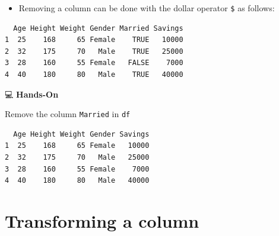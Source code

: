 \documentclass[
  letterpaper,
  DIV=11,
  numbers=noendperiod]{scrreprt}
\newenvironment{Shaded}{\begin{snugshade}}{\end{snugshade}}
\newcommand{\ConstantTok}[1]{\textcolor[rgb]{0.56,0.35,0.01}{#1}}
\newcommand{\NormalTok}[1]{\textcolor[rgb]{0.00,0.23,0.31}{#1}}
\newcommand{\OtherTok}[1]{\textcolor[rgb]{0.00,0.23,0.31}{#1}}
\newcommand{\SpecialCharTok}[1]{\textcolor[rgb]{0.37,0.37,0.37}{#1}}
\providecommand{\tightlist}{%
  \setlength{\itemsep}{0pt}\setlength{\parskip}{0pt}}\usepackage{longtable,booktabs,array}
\begin{document}
\begin{itemize}
\tightlist
\item
  Removing a column can be done with the dollar operator \texttt{\$} as
  follows:
\end{itemize}

\begin{Shaded}
\end{Shaded}

\begin{verbatim}
  Age Height Weight Gender Married Savings
1  25    168     65 Female    TRUE   10000
2  32    175     70   Male    TRUE   25000
3  28    160     55 Female   FALSE    7000
4  40    180     80   Male    TRUE   40000
\end{verbatim}

💻 \textbf{Hands-On}

Remove the column \texttt{Married} in \texttt{df}

\begin{tcolorbox}[enhanced jigsaw, colbacktitle=quarto-callout-tip-color!10!white, opacitybacktitle=0.6, breakable, left=2mm, leftrule=.75mm, toprule=.15mm, toptitle=1mm, bottomtitle=1mm, colframe=quarto-callout-tip-color-frame, opacityback=0, coltitle=black, arc=.35mm, titlerule=0mm, colback=white, bottomrule=.15mm, title=\textcolor{quarto-callout-tip-color}{\faLightbulb}\hspace{0.5em}{Answer}, rightrule=.15mm]

\begin{Shaded}
\end{Shaded}

\begin{verbatim}
  Age Height Weight Gender Savings
1  25    168     65 Female   10000
2  32    175     70   Male   25000
3  28    160     55 Female    7000
4  40    180     80   Male   40000
\end{verbatim}

\end{tcolorbox}

\section{Transforming a column}\label{transforming-a-column}
\end{document}
